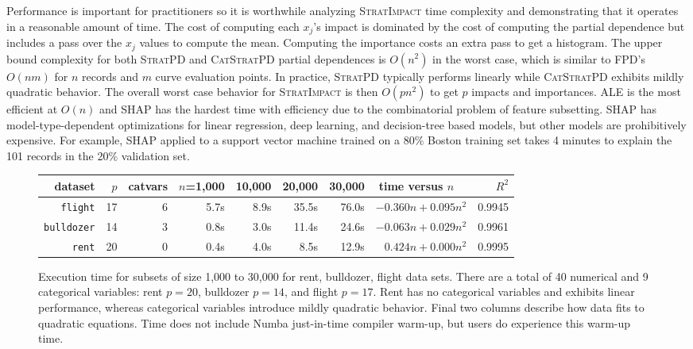\documentclass[11pt]{article}
\newcommand{\simp}{\fontfamily{cmr}\textsc{\small StratImpact}}
\newcommand{\spd}{\fontfamily{cmr}\textsc{\small StratPD}}
\newcommand{\cspd}{\fontfamily{cmr}\textsc{\small CatStratPD}}
\begin{document}
Performance is important for practitioners so it is worthwhile analyzing \simp{} time complexity and demonstrating that it operates in a reasonable amount of time.  The cost of computing each $x_j$'s impact is dominated by the cost of computing the partial dependence but includes a pass over the $x_j$ values to compute the mean. Computing the importance costs an extra pass to get a histogram. The upper bound  complexity for both \spd{} and \cspd{} partial dependences is $O(n^2)$ in the worst case, which is  similar to FPD's $O(nm)$ for $n$ records and $m$ curve evaluation points.  In practice, \spd{} typically performs linearly while \cspd{} exhibits mildly quadratic behavior.  The overall worst case behavior for \simp{} is then $O(p n^2)$ to get $p$ impacts and importances.  ALE is the most efficient at $O(n)$ and SHAP has the hardest time with efficiency due to the combinatorial problem of feature subsetting. SHAP has model-type-dependent optimizations for linear regression, deep learning, and decision-tree based models, but other models are prohibitively expensive. For example, SHAP applied to a support vector machine trained on a 80\% Boston training set takes 4 minutes to explain the 101 records in the 20\% validation set.

\begin{figure}\small
\centering
\begin{tabular}{r r r r r r r r r}
{\bf dataset} & $p$ & catvars & {\small $n$=1,000} & {\small 10,000} & {\small 20,000} & {\small 30,000} & time versus $n$~~ & $R^2$\\
\hline
{\tt\small flight} & 17 & 6 & 5.7s & 8.9s & 35.5s & 76.0s & {\small $-0.360 n + 0.095 n^2$} & {\small 0.9945}\\
{\tt\small bulldozer} & 14 & 3 & 0.8s & 3.0s & 11.4s & 24.6s & {\small $-0.063 n + 0.029 n^2$} & {\small 0.9961}\\
{\tt\small rent} & 20 & 0 & 0.4s & 4.0s & 8.5s & 12.9s & {\small $0.424 n + 0.000 n^2$} & {\small 0.9995}\\
\end{tabular}
\caption{\small  Execution time for subsets of size 1,000 to 30,000 for rent, bulldozer, flight data sets.  There are a total of 40 numerical and 9 categorical variables: rent $p=20$, bulldozer $p=14$, and flight $p=17$. 
Rent has no categorical variables and exhibits linear performance, whereas categorical variables introduce mildly quadratic behavior. Final two columns describe how data fits to quadratic equations. Time does not include Numba just-in-time compiler warm-up, but users do experience this warm-up time.}
\label{fig:timing}
\end{figure}
\end{document}
